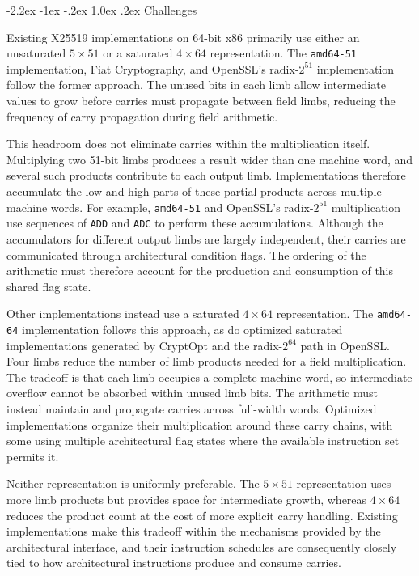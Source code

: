 \documentclass[journal=tches,submission]{iacrtrans}
\makeatletter
\newcommand{\code}[1]{\texttt{#1}}
\renewcommand\subsection{\@startsection{subsection}{2}{\z@}%
      {-2.2ex \@plus -1ex \@minus -.2ex}%
      {1.0ex \@plus .2ex}%
      {\normalfont\large\bfseries\SS@subsectfont}}
\makeatother
\begin{document}
\subsection{Challenges}
\label{sec:c25519-challenge}

Existing X25519 implementations on 64-bit x86 primarily use either an unsaturated $5\times51$ or a saturated $4\times64$ representation.
The \texttt{amd64-51} implementation, Fiat Cryptography, and OpenSSL's radix-$2^{51}$ implementation follow the former approach.
The unused bits in each limb allow intermediate values to grow before carries must propagate between field limbs, reducing the frequency of carry propagation during field arithmetic.

This headroom does not eliminate carries within the multiplication itself.
Multiplying two 51-bit limbs produces a result wider than one machine word, and several such products contribute to each output limb.
Implementations therefore accumulate the low and high parts of these partial products across multiple machine words.
For example, \texttt{amd64-51} and OpenSSL's radix-$2^{51}$ multiplication use sequences of \code{ADD} and \code{ADC} to perform these accumulations.
Although the accumulators for different output limbs are largely independent, their carries are communicated through architectural condition flags.
The ordering of the arithmetic must therefore account for the production and consumption of this shared flag state.

Other implementations instead use a saturated $4\times64$ representation.
The \texttt{amd64-64} implementation follows this approach, as do optimized saturated implementations generated by CryptOpt and the radix-$2^{64}$ path in OpenSSL.
Four limbs reduce the number of limb products needed for a field multiplication.
The tradeoff is that each limb occupies a complete machine word, so intermediate overflow cannot be absorbed within unused limb bits.
The arithmetic must instead maintain and propagate carries across full-width words.
Optimized implementations organize their multiplication around these carry chains, with some using multiple architectural flag states where the available instruction set permits it.

Neither representation is uniformly preferable.
The $5\times51$ representation uses more limb products but provides space for intermediate growth, whereas $4\times64$ reduces the product count at the cost of more explicit carry handling.
Existing implementations make this tradeoff within the mechanisms provided by the architectural interface, and their instruction schedules are consequently closely tied to how architectural instructions produce and consume carries.
\end{document}
